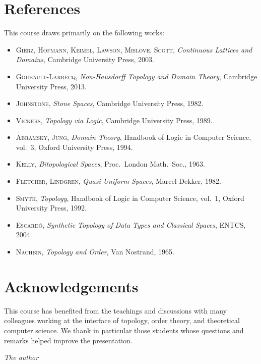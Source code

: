 \section*{References}

This course draws primarily on the following works:
\begin{itemize}
  \item \textsc{Gierz, Hofmann, Keimel, Lawson, Mislove, Scott},
    \emph{Continuous Lattices and Domains}, Cambridge University Press, 2003.
  \item \textsc{Goubault-Larrecq}, \emph{Non-Hausdorff Topology and Domain Theory},
    Cambridge University Press, 2013.
  \item \textsc{Johnstone}, \emph{Stone Spaces}, Cambridge University Press, 1982.
  \item \textsc{Vickers}, \emph{Topology via Logic}, Cambridge University Press, 1989.
  \item \textsc{Abramsky, Jung}, \emph{Domain Theory}, Handbook of Logic in Computer
    Science, vol.~3, Oxford University Press, 1994.
  \item \textsc{Kelly}, \emph{Bitopological Spaces}, Proc.\ London Math.\ Soc., 1963.
  \item \textsc{Fletcher, Lindgren}, \emph{Quasi-Uniform Spaces}, Marcel Dekker, 1982.
  \item \textsc{Smyth}, \emph{Topology}, Handbook of Logic in Computer Science, vol.~1,
    Oxford University Press, 1992.
  \item \textsc{Escard\'o}, \emph{Synthetic Topology of Data Types and Classical Spaces},
    ENTCS, 2004.
  \item \textsc{Nachbin}, \emph{Topology and Order}, Van Nostrand, 1965.
\end{itemize}

\section*{Acknowledgements}

This course has benefited from the teachings and discussions with many colleagues working
at the interface of topology, order theory, and theoretical computer science. We thank
in particular those students whose questions and remarks helped improve the presentation.

\bigskip
\hfill\emph{The author}
